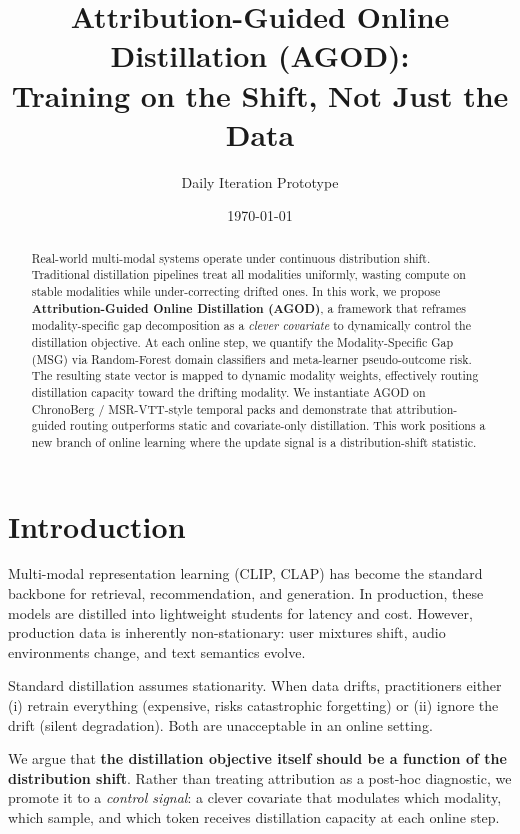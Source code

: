 \documentclass[11pt]{article}
\title{\textbf{Attribution-Guided Online Distillation (AGOD):}\\
\large Training on the Shift, Not Just the Data}
\author{Daily Iteration Prototype}
\date{\today}
\begin{document}
\maketitle

\begin{abstract}
Real-world multi-modal systems operate under continuous distribution shift. Traditional distillation pipelines treat all modalities uniformly, wasting compute on stable modalities while under-correcting drifted ones. In this work, we propose \textbf{Attribution-Guided Online Distillation (AGOD)}, a framework that reframes modality-specific gap decomposition as a \emph{clever covariate} to dynamically control the distillation objective. At each online step, we quantify the Modality-Specific Gap (MSG) via Random-Forest domain classifiers and meta-learner pseudo-outcome risk. The resulting state vector is mapped to dynamic modality weights, effectively routing distillation capacity toward the drifting modality. We instantiate AGOD on ChronoBerg / MSR-VTT-style temporal packs and demonstrate that attribution-guided routing outperforms static and covariate-only distillation. This work positions a new branch of online learning where the update signal is a distribution-shift statistic.
\end{abstract}

\section{Introduction}
\label{sec:intro}

Multi-modal representation learning (CLIP, CLAP) has become the standard backbone for retrieval, recommendation, and generation. In production, these models are distilled into lightweight students for latency and cost. However, production data is inherently non-stationary: user mixtures shift, audio environments change, and text semantics evolve.

Standard distillation assumes stationarity. When data drifts, practitioners either (i) retrain everything (expensive, risks catastrophic forgetting) or (ii) ignore the drift (silent degradation). Both are unacceptable in an online setting.

We argue that \textbf{the distillation objective itself should be a function of the distribution shift}. Rather than treating attribution as a post-hoc diagnostic, we promote it to a \emph{control signal}: a clever covariate that modulates which modality, which sample, and which token receives distillation capacity at each online step.
\end{document}
